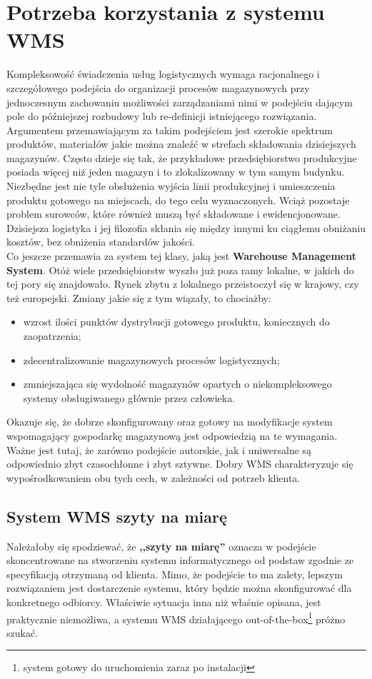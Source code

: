 \section{Potrzeba korzystania z systemu WMS}
	Kompleksowość świadczenia usług logistycznych wymaga racjonalnego i szczegółowego podejścia
	do organizacji procesów magazynowych przy jednoczesnym zachowaniu możliwości zarządzaniami
	nimi w podejściu dającym pole do późniejszej rozbudowy lub re-definicji istniejącego
	rozwiązania. Argumentem przemawiającym za takim podejściem jest szerokie spektrum 
	produktów, materiałów jakie można znaleźć w strefach składowania dzisiejszych magazynów.
	Często dzieje się tak, że przykładowe przedsiębiorstwo produkcyjne posiada więcej niż jeden
	magazyn i to zlokalizowany w tym samym budynku. Niezbędne jest nie tyle obsłużenia
	wyjścia linii produkcyjnej i umieszczenia produktu gotowego na miejscach, do tego celu wyznaczonych.
	Wciąż pozostaje problem surowców, które również muszą być składowane i ewidencjonowane. Dzisiejsza
	logistyka i jej filozofia skłania się między innymi ku ciągłemu obniżaniu kosztów, bez obniżenia
	standardów jakości. \\
	
	Co jeszcze przemawia za system tej klasy, jaką jest \textbf{Warehouse Management System}. Otóż 
	wiele przedsiębiorstw wyszło już poza ramy lokalne, w jakich do tej pory się znajdowało. Rynek zbytu
	z lokalnego przeistoczył się w krajowy, czy też europejski. Zmiany jakie się z tym wiązały, to chociażby:
	\begin{itemize}
		\item wzrost ilości punktów dystrybucji gotowego produktu, koniecznych do zaopatrzenia;
		\item zdecentralizowanie magazynowych procesów logistycznych;
		\item zmniejszająca się wydolność magazynów opartych o niekompleksowego systemy
		obsługiwanego głównie przez człowieka.
	\end{itemize}
	Okazuje się, że dobrze skonfigurowany oraz gotowy na modyfikacje system wspomagający gospodarkę magazynową
	jest odpowiedzią na te wymagania. Ważne jest tutaj, że zarówno podejście autorskie, jak i uniwersalne są
	odpowiednio zbyt czasochłonne i zbyt sztywne. Dobry WMS charakteryzuje się wypośrodkowaniem obu tych 
	cech, w zależności od potrzeb klienta. \\
	
	\subsection{System WMS szyty na miarę}
	Należałoby się spodziewać, że \textbf{,,szyty na miarę''} oznacza w podejście skoncentrowane
	na stworzeniu systemu informatycznego od podstaw zgodnie ze specyfikacją otrzymaną od klienta.
	Mimo, że podejście to ma zalety, lepszym rozwiązaniem jest dostarczenie systemu, który 
	będzie można skonfigurować dla konkretnego odbiorcy. Właściwie sytuacja inna niż właśnie opisana,
	jest praktycznie niemożliwa, a systemu WMS działającego out-of-the-box\footnote{system gotowy do
	uruchomienia zaraz po instalacji} próżno szukać.\\
		
